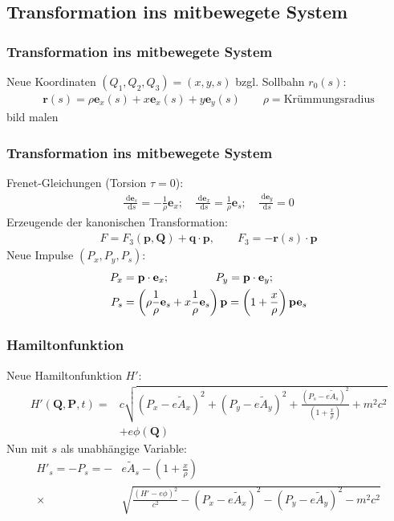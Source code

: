 \documentclass[hyperref={pdfpagelabels=false}]{beamer}
\newcommand {\dx} {\; \mathrm{d} }              %
\begin{document}
\subsection{Transformation ins mitbewegete System}
\begin{frame}
\frametitle{Transformation ins mitbewegete System}
\pause
Neue Koordinaten $(Q_1,Q_2,Q_3) = (x,y,s)$ bzgl. Sollbahn $r_0(s)$:
\begin{align*}
 \mathbf{r}(s) = \rho\mathbf{e}_x(s) + x\mathbf{e}_x(s) + y\mathbf{e}_y(s) \qquad \rho = \text{Krümmungsradius}
\end{align*}
bild malen

\end{frame}

\begin{frame}
 \frametitle{Transformation ins mitbewegete System}
 \pause
 Frenet-Gleichungen (Torsion $\tau=0$):
 \begin{align*}
  \frac{\dx \mathbf{e}_s}{\dx s} = -\frac{1}{\rho}\mathbf{e}_x;\quad\frac{\dx \mathbf{e}_x}{\dx s} = \frac{1}{\rho}\mathbf{e}_s;\quad\frac{\dx \mathbf{e}_y}{\dx s} = 0
 \end{align*}
 Erzeugende der kanonischen Transformation:
 \begin{align*}
  F = F_3(\mathbf{p},\mathbf{Q}) + \mathbf{q}\cdot\mathbf{p}, \qquad F_3 = -\mathbf{r}(s)\cdot\mathbf{p}
 \end{align*}
 Neue Impulse $(P_x, P_y,P_s)$:
 \begin{align*}
  P_x &= \mathbf{p}\cdot\mathbf{e}_x; \hspace{1.45cm} P_y = \mathbf{p}\cdot\mathbf{e}_y;\\
  P_s &= \left(\rho\frac{1}{\rho}\mathbf{e}_s+x\frac{1}{\rho}\mathbf{e}_s\right)\mathbf{p} = \left(1+\frac{x}{\rho}\right)\mathbf{p}\mathbf{e}_s
 \end{align*}

\end{frame}

\begin{frame}
 \frametitle{Hamiltonfunktion}
 \pause
 Neue Hamiltonfunktion $H'$:
 \begin{align*}
  H'(\mathbf{Q},\mathbf{P},t) = &c\sqrt{(P_x-e\tilde{A}_x)^2+(P_y-e\tilde{A}_y)^2+\frac{(P_s-e\tilde{A}_s)^2}{\left(1+\frac{x}{\rho}\right)}+m^2c^2} \\
  &+ e\phi(\mathbf{Q})
 \end{align*}
 Nun mit $s$ als unabhängige Variable:
 \begin{align*}
  H'_s = -P_s = -&e\tilde{A}_s-\left(1+\frac{x}{\rho}\right)\\
  \times& \sqrt{\frac{(H'-e\phi)^2}{c^2}-(P_x-e\tilde{A}_x)^2-(P_y-e\tilde{A}_y)^2 -m^2c^2}
 \end{align*}
\end{frame}
\end{document}
